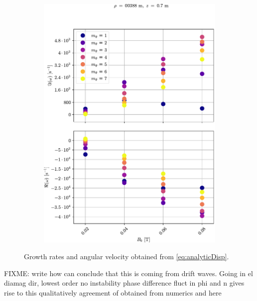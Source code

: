 \begin{figure}[htb]
\begin{subfigure}[h]{1.00\textwidth}
        \includegraphics[width=1.0\textwidth]{fig/results/growthRates/growthRatesAnalyticB0ModeNr}
        \label{fig:grAnalyticBModeNr}
    \end{subfigure}
    \caption{Growth rates and angular velocity obtained from \cref{eq:analyticDisp}.}
    \label{fig:grAnalytic}
\end{figure}
%
FIXME:
write how can conclude that this is coming from drift waves.
Going in el diamag dir,
lowest order no instability
phase difference fluct in phi and n gives rise to this
qualitatively agreement of obtained from numerics and here


